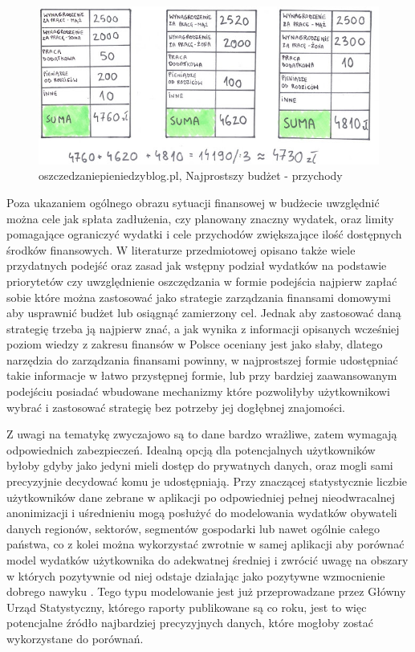 \documentclass[a4paper,10pt, twoside]{report}
\begin{document}
\begin{large}
\begin{figure}[H]           %
    \centering
    \includegraphics[width=12cm]{figures/oszczedzaniepieniedzyblog-pl_przychody.jpg}
    \caption{oszczedzaniepieniedzyblog.pl, Najprostszy budżet - przychody}
    \label{fig:prostybudżetprzychody}
\end{figure}

{Poza ukazaniem ogólnego obrazu sytuacji finansowej w budżecie uwzględnić można 
cele jak spłata zadłużenia, czy planowany znaczny wydatek, oraz limity 
pomagające ograniczyć wydatki i cele przychodów zwiększające ilość dostępnych 
środków finansowych. W literaturze przedmiotowej opisano także wiele przydatnych
 podejść oraz zasad jak wstępny podział wydatków na podstawie 
priorytetów \cite{najbogatszyczlowiekwbabilonie}\cite{budzetdomowypodkontrola} 
czy uwzględnienie oszczędzania w formie podejścia najpierw zapłać sobie 
\cite{najbogatszyczlowiekwbabilonie}\cite{finansowaforteca} które można 
zastosować jako strategie zarządzania finansami domowymi aby usprawnić budżet 
lub osiągnąć zamierzony cel. Jednak aby zastosować daną strategię trzeba ją 
najpierw znać, a jak wynika z informacji opisanych wcześniej poziom wiedzy z 
zakresu finansów w Polsce oceniany jest jako słaby, dlatego narzędzia do 
zarządzania finansami powinny, w najprostszej formie udostępniać takie 
informacje w łatwo przystępnej formie, lub przy bardziej zaawansowanym podejściu
 posiadać wbudowane mechanizmy które pozwoliłyby użytkownikowi wybrać i 
zastosować strategię bez potrzeby jej dogłębnej znajomości.}

{Z uwagi na tematykę zwyczajowo są to dane bardzo wrażliwe, zatem wymagają 
odpowiednich zabezpieczeń. Idealną opcją dla potencjalnych użytkowników byłoby 
gdyby jako jedyni mieli dostęp do prywatnych danych, oraz mogli sami precyzyjnie
 decydować komu je udostępniają. Przy znaczącej statystycznie liczbie 
użytkowników dane zebrane w aplikacji po odpowiedniej pełnej nieodwracalnej 
anonimizacji i uśrednieniu mogą posłużyć do modelowania wydatków obywateli 
danych regionów, sektorów, segmentów gospodarki lub nawet ogólnie całego 
państwa, co z kolei można wykorzystać zwrotnie w samej aplikacji aby porównać 
model wydatków użytkownika do adekwatnej średniej i zwrócić uwagę na obszary w 
których pozytywnie od niej odstaje działając jako pozytywne wzmocnienie 
dobrego nawyku \cite{pozytywnewzmocnienie}. Tego typu modelowanie jest już 
przeprowadzane przez Główny Urząd Statystyczny, którego raporty publikowane są 
co roku, jest to więc potencjalne źródło najbardziej precyzyjnych danych, które 
mogłoby zostać wykorzystane do porównań.}



\end{large}
\end{document}
